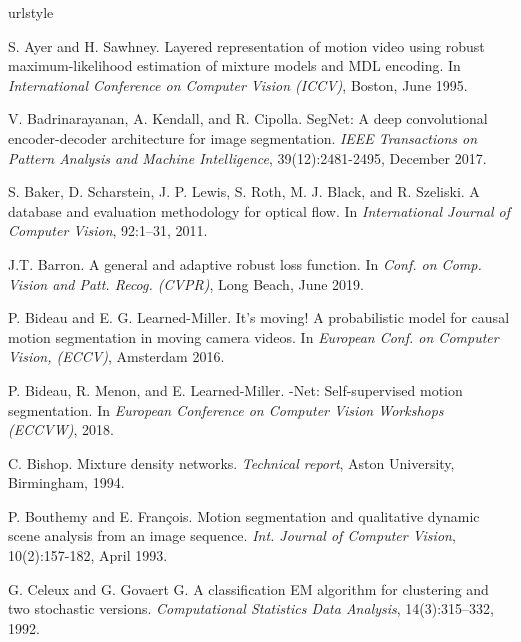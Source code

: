 \documentclass[10pt,twocolumn,letterpaper]{article}
\begin{document}
\small
\vspace{-0.15cm}
\begin{thebibliography}{28}
\providecommand{\natexlab}[1]{#1}
\providecommand{\url}[1]{\texttt{#1}}
\expandafter\ifx\csname urlstyle\endcsname\relax
  \providecommand{\doi}[1]{doi: #1}\else
  \providecommand{\doi}{doi: \begingroup \urlstyle{rm}\Url}\fi
  
S. Ayer and H. Sawhney.
\newblock Layered representation of motion video using robust maximum-likelihood estimation of mixture models and MDL encoding.
\newblock In \emph{International Conference on Computer Vision (ICCV)}, Boston, June 1995.


V. Badrinarayanan, A. Kendall, and R. Cipolla.
\newblock SegNet: A deep convolutional encoder-decoder architecture for image segmentation.
\newblock \emph{IEEE Transactions on Pattern Analysis and Machine Intelligence}, 39(12):2481-2495, December 2017.

S. Baker, D. Scharstein, J. P. Lewis, S. Roth, M. J. Black, and R. Szeliski.
\newblock A database and evaluation methodology for optical flow.
\newblock In \emph{International Journal of Computer Vision}, 92:1–31, 2011.

J.T. Barron.
\newblock A general and adaptive robust loss function.
\newblock In \emph{Conf. on Comp. Vision and Patt. Recog. (CVPR)}, Long Beach, June 2019.

P. Bideau and E. G. Learned-Miller.
\newblock It’s moving! A probabilistic model for causal motion segmentation in moving camera videos.
\newblock In \emph{European Conf. on Computer Vision, (ECCV)}, Amsterdam 2016.

P. Bideau, R. Menon, and E. {Learned-Miller}.
-{{Net}}: {{Self}}-{{supervised motion segmentation}}.
\newblock In \emph{{{European Conference}} on {{Computer Vision}} {{Workshops}} ({{ECCVW}})}, 2018.

C. Bishop.
\newblock Mixture density networks.
\newblock \emph{Technical report}, Aston University, Birmingham, 1994.

P. Bouthemy and E. François.
\newblock Motion segmentation and qualitative dynamic scene analysis from an image sequence.
\newblock \emph{Int. Journal of Computer Vision}, 10(2):157-182, April 1993.

G. Celeux and G. Govaert G.
\newblock A classification EM algorithm for clustering and two stochastic versions.
\newblock \emph{Computational Statistics Data Analysis}, 14(3):315–332, 1992.


\end{thebibliography}
\end{document}

